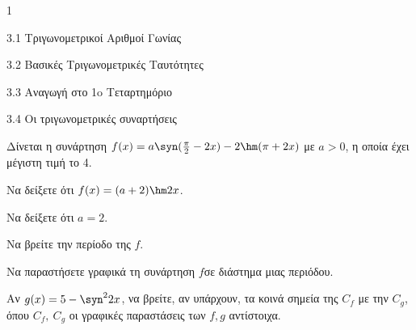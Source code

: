 \begin{ylh}{1}
\item 3.1 Τριγωνομετρικοί Αριθμοί Γωνίας
\item 3.2 Βασικές Τριγωνομετρικές Ταυτότητες
\item 3.3 Αναγωγή στο 1o Τεταρτημόριο
\item 3.4 Οι τριγωνομετρικές συναρτήσεις
\end{ylh}
Δίνεται η συνάρτηση $f(x) = a\syn (\frac{\pi}{2} - 2x) - 2\hm (\pi + 2x)$ με $a > 0$, η οποία έχει μέγιστη τιμή το 4.
\begin{alist}
\item Να δείξετε ότι $f(x) = (a + 2)\hm  2x$.
\item
\end{alist}
\begin{alist}
\item
  Να δείξετε ότι $a = 2$.
\end{alist}
\begin{alist}
\item
  Να βρείτε την περίοδο της $f$.
\item Να παραστήσετε γραφικά τη συνάρτηση $f$σε διάστημα μιας περιόδου.
\item Αν $g(x) = 5 - \syn^{2}2x$, να βρείτε, αν υπάρχουν, τα κοινά σημεία της $C_{f}$ με την $C_{g}$, όπου $C_{f},\ C_{g}$ οι γραφικές παραστάσεις των $f,g$ αντίστοιχα.
\end{alist}

